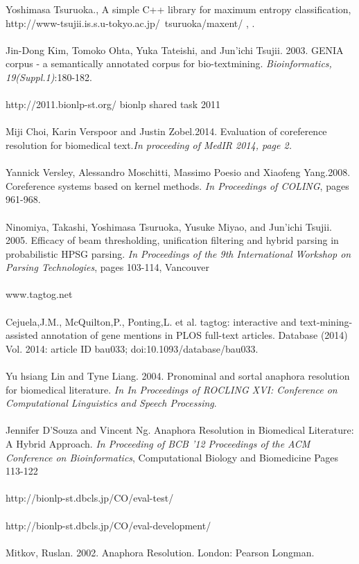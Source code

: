 \big[61\big] Yoshimasa Tsuruoka., A simple C++ library for maximum entropy classification, http://www-tsujii.is.s.u-tokyo.ac.jp/~tsuruoka/maxent/ , .\\  \\
\big[62\big] Jin-Dong Kim, Tomoko Ohta, Yuka Tateishi, and Jun'ichi Tsujii. 2003. GENIA corpus - a semantically annotated corpus for bio-textmining. \emph{Bioinformatics, 19(Suppl.1)}:180-182. \\  \\
\big[63\big]http://2011.bionlp-st.org/ bionlp shared task 2011\\  \\
\big[64\big] Miji Choi, Karin Verspoor and Justin Zobel.2014. Evaluation of coreference resolution for biomedical text.\emph{In proceeding of MedIR 2014, page 2.} \\ \\
\big[65\big]  Yannick Versley, Alessandro Moschitti, Massimo Poesio and Xiaofeng Yang.2008. Coreference systems based on kernel methods. \emph{In Proceedings of COLING}, pages 961-968.\\  \\
\big[66\big] Ninomiya, Takashi, Yoshimasa Tsuruoka, Yusuke Miyao, and Jun'ichi Tsujii. 2005. Efficacy of beam thresholding, unification filtering and hybrid parsing in probabilistic HPSG parsing. \emph{In Proceedings of the 9th International Workshop on Parsing Technologies}, pages 103-114, Vancouver \\  \\
\big[67\big] www.tagtog.net \\  \\
\big[68\big] Cejuela,J.M., McQuilton,P., Ponting,L. et al. tagtog: interactive and text-mining-assisted annotation of gene mentions in PLOS full-text articles. Database (2014) Vol. 2014: article ID bau033; doi:10.1093/database/bau033. \\  \\
\big[69\big] Yu hsiang Lin and Tyne Liang. 2004. Pronominal and sortal anaphora resolution for biomedical literature. \emph{In In Proceedings of ROCLING XVI: Conference on Computational Linguistics and Speech Processing}. \\  \\
\big[70\big] Jennifer D'Souza and Vincent Ng. Anaphora Resolution in Biomedical Literature: A Hybrid Approach. \emph{In Proceeding of BCB '12 Proceedings of the ACM Conference on Bioinformatics}, Computational Biology and Biomedicine Pages 113-122 \\  \\
\big[71\big] http://bionlp-st.dbcls.jp/CO/eval-test/\\  \\
\big[72\big] http://bionlp-st.dbcls.jp/CO/eval-development/\\  \\
\big[73\big] Mitkov, Ruslan. 2002. Anaphora Resolution. London: Pearson Longman.\\  \\


